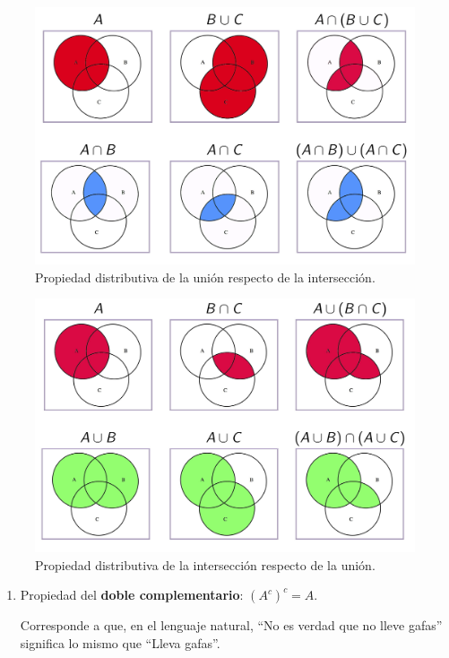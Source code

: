 \documentclass[
]{book}
\theoremstyle{definition}
\theoremstyle{definition}
\theoremstyle{definition}
\theoremstyle{definition}
\theoremstyle{remark}
\begin{document}
\begin{figure}

{\centering \includegraphics[width=0.8\linewidth]{INREMDN_files/figure-html/distr1BD} 

}

\caption{Propiedad distributiva de la unión respecto de la intersección.}\label{fig:unnamed-chunk-89}
\end{figure}

\begin{figure}

{\centering \includegraphics[width=0.8\linewidth]{INREMDN_files/figure-html/distr2BD} 

}

\caption{Propiedad distributiva de la intersección respecto de la unión.}\label{fig:unnamed-chunk-90}
\end{figure}

\begin{enumerate}
\def\labelenumi{\alph{enumi}.}
\setcounter{enumi}{4}
\item
  Propiedad del \textbf{doble complementario}: \((A^c)^c=A\).

  Corresponde a que, en el lenguaje natural, ``No es verdad que no lleve gafas'' significa lo mismo que ``Lleva gafas''.
\end{enumerate}
\end{document}
